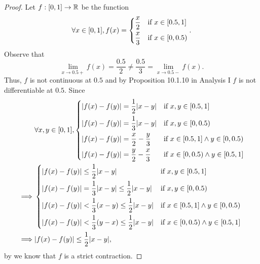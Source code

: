 \begin{proof}
  Let \(f : [0, 1] \to \mathbb{R}\) be the function
  \[
    \forall x \in [0, 1], f(x) = \begin{dcases}
      \dfrac{x}{2} & \text{if } x \in [0.5, 1] \\
      \dfrac{x}{3} & \text{if } x \in [0, 0.5)
    \end{dcases}.
  \]
  Observe that
  \[
    \lim_{x \to 0.5+} f(x) = \dfrac{0.5}{2} \neq \dfrac{0.5}{3} = \lim_{x \to 0.5-} f(x).
  \]
  Thus, \(f\) is not continuous at \(0.5\) and by Proposition 10.1.10 in Analysis I \(f\) is not differentiable at \(0.5\).
  Since
  \begin{align*}
             & \forall x, y \in [0, 1], \begin{dcases}
                                          \abs{f(x) - f(y)} = \dfrac{1}{2} \abs{x - y}    & \text{if } x, y \in [0.5, 1]                   \\
                                          \abs{f(x) - f(y)} = \dfrac{1}{3} \abs{x - y}    & \text{if } x, y \in [0, 0.5)                   \\
                                          \abs{f(x) - f(y)} = \dfrac{x}{2} - \dfrac{y}{3} & \text{if } x \in [0.5, 1] \land y \in [0, 0.5) \\
                                          \abs{f(x) - f(y)} = \dfrac{y}{2} - \dfrac{x}{3} & \text{if } x \in [0, 0.5) \land y \in [0.5, 1]
                                        \end{dcases}   \\
    \implies & \begin{dcases}
                 \abs{f(x) - f(y)} \leq \dfrac{1}{2} \abs{x - y}                            & \text{if } x, y \in [0.5, 1]                   \\
                 \abs{f(x) - f(y)} = \dfrac{1}{3} \abs{x - y} \leq \dfrac{1}{2} \abs{x - y} & \text{if } x, y \in [0, 0.5)                   \\
                 \abs{f(x) - f(y)} < \dfrac{1}{3} (x - y) \leq \dfrac{1}{2} \abs{x - y}     & \text{if } x \in [0.5, 1] \land y \in [0, 0.5) \\
                 \abs{f(x) - f(y)} < \dfrac{1}{3} (y - x) \leq \dfrac{1}{2} \abs{x - y}     & \text{if } x \in [0, 0.5) \land y \in [0.5, 1]
               \end{dcases} \\
    \implies & \abs{f(x) - f(y)} \leq \dfrac{1}{2} \abs{x - y},
  \end{align*}
  by  we know that \(f\) is a strict contraction.
\end{proof}

